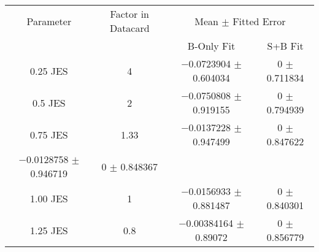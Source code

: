 \begin{scriptsize}
\begin{table}
\centering
\begin{tabular}{cccc}
\toprule
Parameter & Factor in Datacard & \multicolumn{2}{c}{{Mean $\pm$ Fitted Error}}\\
 & & {B-Only Fit} & {S+B Fit}\\
\midrule
\num[round-precision=2]{0.25} JES & 4 & \num{-0.0723904} $\pm$ \num{0.604034} & \num{0} $\pm$ \num{0.711834}\\
\num[round-precision=2]{0.5} JES & 2 & \num{-0.0750808} $\pm$ \num{0.919155} & \num{0} $\pm$ \num{0.794939}\\
\num[round-precision=2]{0.75} JES & \num[round-precision=2]{1.33} & \num{-0.0137228} $\pm$ \num{0.947499} & \num{0} $\pm$ \num{0.847622}\\
\num{-0.0128758} $\pm$ \num{0.946719} & \num{0} $\pm$ \num{0.848367}\\
\num[round-precision=2]{1.00} JES & 1 & \num{-0.0156933} $\pm$ \num{0.881487} & \num{0} $\pm$ \num{0.840301}\\
\num[round-precision=2]{1.25} JES & \num[round-precision=2]{0.8} & \num{-0.00384164} $\pm$ \num{0.89072} & \num{0} $\pm$ \num{0.856779}\\

\bottomrule
\end{tabular}
\end{table}
\end{scriptsize}
